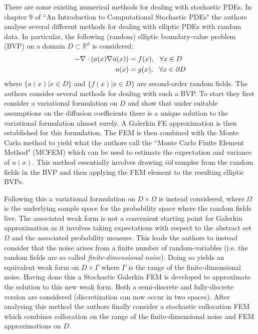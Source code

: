 There are some existing numerical methods for dealing with stochastic PDEs. In chapter 9 of ``An Introduction to Computational Stochastic PDEs" \textcolor{blue}{\citep{lord2014introduction}} the authors analyse several different methods for dealing with elliptic PDEs with random data. In particular, the following (random) elliptic boundary-value problem (BVP) on a domain $D\subset\mathbb{R}^d$ is considered:
\begin{align*}
-\nabla \cdot(a(x) \nabla u(x)) &=f(x), \hspace{0.25cm} \forall x \in D \\
u(x) &=g(x), \hspace{0.25cm} \forall x \in \partial D
\end{align*}
where $\{a(x)|x\in D\}$ and $\{f(x)|x\in D\}$ are second-order random fields. The authors consider several methods for dealing with such a BVP. To start they first consider a variational formulation on $D$ and show that under suitable assumptions on the diffusion coefficients there is a unique solution to the variational formulation almost surely. A Galerkin FE approximation is then established for this formulation.
The FEM is then combined with the Monte Carlo method to yield what the authors call the ``Monte Carlo Finite Element Method" (MCFEM) which can be used to estimate the expectation and variance of $u(x)$. This method essentially involves drawing \textit{iid} samples from the random fields in the BVP and then applying the FEM element to the resulting elliptic BVPs.

Following this a variational formulation on $D\times\Omega$ is instead considered, where $\Omega$ is the underlying sample space for the probability space where the random fields live. The associated weak form is not a convenient starting point for Galerkin approximation as it involves taking expectations with respect to the abstract set $\Omega$ and the associated probability measure.
This leads the authors to instead consider that the noise arises from a finite number of random-variables (i.e. the random fields are so called \textit{finite-dimensional noise}). Doing so yields an equivalent weak form on $D\times\Gamma$ where $\Gamma$ is the range of the finite-dimensional noise. Having done this a Stochastic Galerkin FEM is developed to approximate the solution to this new weak form. Both a semi-discrete and fully-discrete version are considered (discretization can now occur in two spaces). After analysing this method the authors finally consider a stochastic collocation FEM which combines collocation on the range of the finite-dimensional noise and FEM approximations on $D$.

